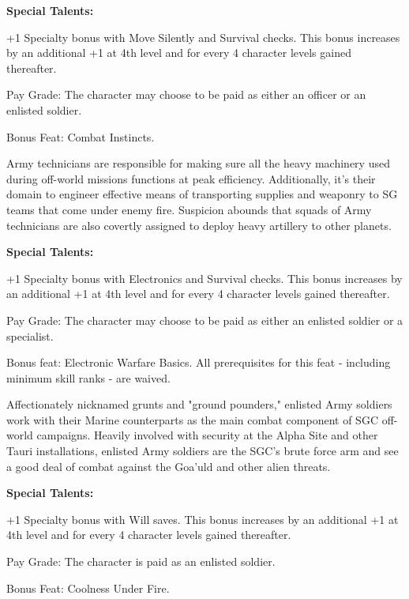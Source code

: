\textbf{Special Talents:}
\begin{itemize*}
\item +1 Specialty bonus with Move Silently and Survival checks. This bonus increases by an additional +1 at 4th level and for every 4 character levels gained thereafter.
\item Pay Grade: The character may choose to be paid as either an officer or an enlisted soldier.
\item Bonus Feat: Combat Instincts.
\end{itemize*}

Army technicians are responsible for making sure all the heavy machinery used during off-world missions functions at peak efficiency. Additionally, it's their domain to engineer effective means of transporting supplies and weaponry to SG teams that come under enemy fire. Suspicion abounds that squads of Army technicians are also covertly assigned to deploy heavy artillery to other planets.

\textbf{Special Talents:}
\begin{itemize*}
\item +1 Specialty bonus with Electronics and Survival checks. This bonus increases by an additional +1 at 4th level and for every 4 character levels gained thereafter.
\item Pay Grade: The character may choose to be paid as either an enlisted soldier or a specialist.
\item Bonus feat: Electronic Warfare Basics. All prerequisites for this feat - including minimum skill ranks - are waived.
\end{itemize*}

Affectionately nicknamed grunts and "ground pounders," enlisted Army soldiers work with their Marine counterparts as the main combat component of SGC off-world campaigns. Heavily involved with security at the Alpha Site and other Tauri installations, enlisted Army soldiers are the SGC's brute force arm and see a good deal of combat against the Goa'uld and other alien threats.

\textbf{Special Talents:}
\begin{itemize*}
\item +1 Specialty bonus with Will saves. This bonus increases by an additional +1 at 4th level and for every 4 character levels gained thereafter.
\item Pay Grade: The character is paid as an enlisted soldier.
\item Bonus Feat: Coolness Under Fire.
\end{itemize*}

